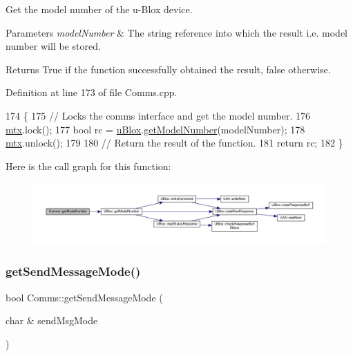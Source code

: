 Get the model number of the u-\/\+Blox device.


\begin{DoxyParams}{Parameters}
{\em model\+Number} & The string reference into which the result i.\+e. model number will be stored. \\
\hline
\end{DoxyParams}
\begin{DoxyReturn}{Returns}
True if the function successfully obtained the result, false otherwise. 
\end{DoxyReturn}


Definition at line 173 of file Comms.\+cpp.


\begin{DoxyCode}
174 \{
175     \textcolor{comment}{// Locks the comms interface and get the model number.}
176     \hyperlink{class_comms_a21df861b1202573e4cd0cb5666d638fe}{mtx}.lock();
177     \textcolor{keywordtype}{bool} rc = \hyperlink{class_comms_ac64dea134b116147e5441172346dbd6c}{uBlox}.\hyperlink{class_u_blox_ab9b9a03e10360c931686c1fe04af078d}{getModelNumber}(modelNumber);
178     \hyperlink{class_comms_a21df861b1202573e4cd0cb5666d638fe}{mtx}.unlock();
179 
180     \textcolor{comment}{// Return the result of the function.}
181     \textcolor{keywordflow}{return} rc;
182 \}
\end{DoxyCode}
Here is the call graph for this function\+:
\nopagebreak
\begin{figure}[H]
\begin{center}
\leavevmode
\includegraphics[width=350pt]{d8/dcc/class_comms_a02eb048febea2d1a39a7fe9e064cf93c_cgraph}
\end{center}
\end{figure}
\mbox{\label{class_comms_ade9963ad1f934a79a6b584dd7abfe515}} 
\subsubsection{\texorpdfstring{get\+Send\+Message\+Mode()}{getSendMessageMode()}}
{\footnotesize\ttfamily bool Comms\+::get\+Send\+Message\+Mode (\begin{DoxyParamCaption}\item[{char \&}]{send\+Msg\+Mode }\end{DoxyParamCaption})}

